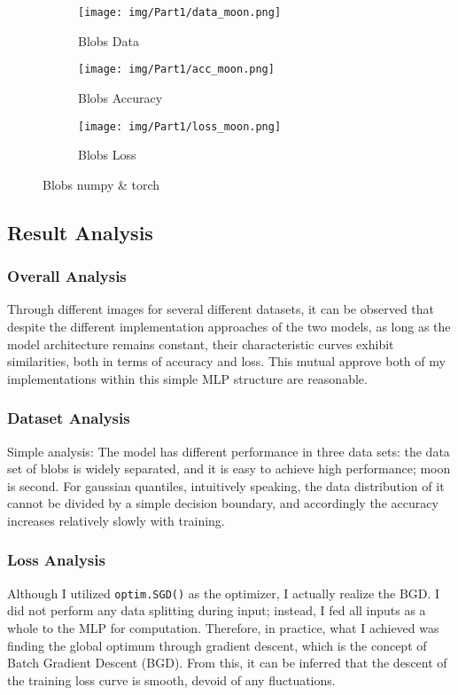 \begin{figure}[!htp]
  \centering
  \begin{subfigure}[b]{0.85\textwidth}
    \texttt{[image: img/Part1/data\_moon.png]}
    \caption{Blobs Data}
  \end{subfigure}
  \begin{subfigure}[b]{0.9\textwidth}
    \texttt{[image: img/Part1/acc\_moon.png]}
    \caption{Blobs Accuracy}
  \end{subfigure}
  \begin{subfigure}[b]{0.9\textwidth}
    \texttt{[image: img/Part1/loss\_moon.png]}
    \caption{Blobs Loss}
  \end{subfigure}
  \caption{Blobs numpy \& torch}
  \label{fig:p1t1_moon}
\end{figure}

\subsection{Result Analysis}

\subsubsection{Overall Analysis}

Through different images for several different datasets, it can be observed that despite the different implementation approaches of the two models,
as long as the model architecture remains constant, their characteristic curves exhibit similarities, both in terms of accuracy and loss.
This mutual approve both of my implementations within this simple MLP structure are reasonable.

\subsubsection{Dataset Analysis}

Simple analysis: The model has different performance in three data sets: the data set of blobs is widely separated, and it is easy to achieve high performance; moon is second.
For gaussian quantiles, intuitively speaking, the data distribution of it cannot be divided by a simple decision boundary, and accordingly the accuracy increases relatively slowly with training.

\subsubsection{Loss Analysis}\label{sec:p1t1_ana_loss}

Although I utilized \texttt{optim.SGD()} as the optimizer, I actually realize the BGD. I did not perform any data splitting during input; instead, I fed all inputs as a whole to the MLP for computation.
Therefore, in practice, what I achieved was finding the global optimum through gradient descent, which is the concept of Batch Gradient Descent (BGD).
From this, it can be inferred that the descent of the training loss curve is smooth, devoid of any fluctuations.
